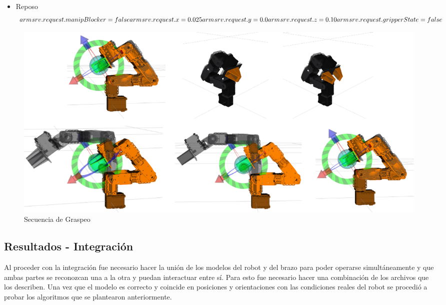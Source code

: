 \begin{itemize}
    \item Reposo\\
    \begin{equation*}
        arm_{}srv.request.manipBlocker = false\\
        arm_{}srv.request.x = 0.025\\
        arm_{}srv.request.y = 0.0\\
        arm_{}srv.request.z = 0.10\\
        arm_{}srv.request.gripperState = false
    \end{equation*}
\end{itemize}

\begin{figure}[H]
    \centering
    \includegraphics[scale=0.3]{Figures/Grasping_sequence.png}
        \caption{Secuencia de Graspeo}
        \label{fig:Grasping_Sequence}
\end{figure}

\subsection{Resultados - Integración}
Al proceder con la integración fue necesario hacer la unión de los modelos del robot y del brazo para poder operarse simultáneamente y que ambas partes se reconozcan una a la otra y puedan interactuar entre sí. Para esto fue necesario hacer una combinación de los archivos que los describen. Una vez que el modelo es correcto y coincide en posiciones y orientaciones con las condiciones reales del robot se procedió a probar los algoritmos que se plantearon anteriormente. 





